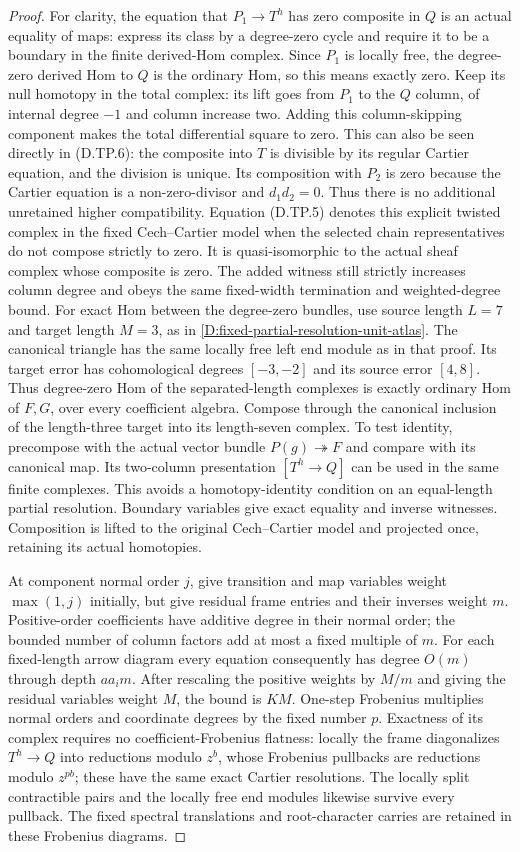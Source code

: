 \begin{proof}
For clarity, the equation that $P_1\to T^h$ has
zero composite in $Q$ is an actual equality of
maps: express its class by a degree-zero cycle
and require it to be a boundary in the finite
derived-Hom complex. Since $P_1$ is locally free,
the degree-zero derived Hom to $Q$ is the
ordinary Hom, so this means exactly zero.
Keep its null homotopy in the total complex:
its lift goes from $P_1$ to the $Q$ column, of internal degree
$-1$ and column increase two. Adding this
column-skipping component makes the total
differential square to zero. This can also
be seen directly in (D.TP.6): the composite
into $T$ is divisible by its regular Cartier
equation, and the division is unique. Its
composition with $P_2$ is zero because the
Cartier equation is a non-zero-divisor and
$d_1d_2=0$. Thus there is no additional
unretained higher compatibility. Equation
(D.TP.5) denotes
this explicit twisted complex in the fixed
Cech--Cartier model when the selected chain
representatives do not compose strictly to
zero. It is quasi-isomorphic to the actual
sheaf complex whose composite is zero.
The added witness still strictly increases
column degree and obeys the same fixed-width
termination and weighted-degree bound.
For exact Hom between the degree-zero bundles,
use source length $L=7$ and target length $M=3$,
as in \ref{D:fixed-partial-resolution-unit-atlas}.
The canonical triangle has the same locally
free left end module as in that proof. Its
target error has cohomological degrees
$[-3,-2]$ and its source error $[4,8]$.
Thus degree-zero Hom of the separated-length
complexes is exactly ordinary Hom of $F,G$,
over every coefficient algebra. Compose
through the canonical inclusion of the
length-three target into its length-seven
complex. To test identity, precompose with
the actual vector bundle $P(g)\twoheadrightarrow F$
and compare with its canonical map. Its
two-column presentation $[T^h\to Q]$ can
be used in the same finite complexes.
This avoids a homotopy-identity condition
on an equal-length partial resolution.
Boundary variables give exact equality
and inverse witnesses. Composition is
lifted to the original Cech--Cartier model
and projected once, retaining its actual
homotopies.

At component normal order $j$, give transition
and map variables weight $\max(1,j)$ initially,
but give residual frame entries and their
inverses weight $m$. Positive-order coefficients
have additive degree in their normal order;
the bounded number of column factors add at most
a fixed multiple of $m$. For each fixed-length
arrow diagram every equation consequently has
degree $O(m)$ through depth $aa_i m$.
After rescaling the positive weights by $M/m$
and giving the residual variables weight $M$,
the bound is $KM$. One-step Frobenius multiplies
normal orders and coordinate degrees by the
fixed number $p$. Exactness of its complex
requires no coefficient-Frobenius flatness:
locally the frame diagonalizes $T^h\to Q$
into reductions modulo $z^b$, whose Frobenius
pullbacks are reductions modulo $z^{pb}$;
these have the same exact Cartier resolutions.
The locally split contractible pairs and the
locally free end modules likewise survive
every pullback. The fixed spectral translations
and root-character carries are retained in
these Frobenius diagrams.


\end{proof}
